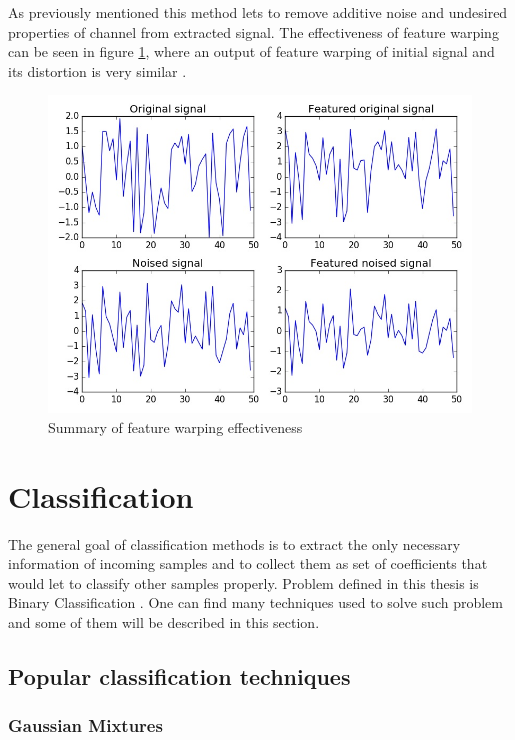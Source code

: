 \documentclass[magister]{dyplom}
\begin{document}
	As previously mentioned this method lets to remove additive noise and undesired properties of channel from extracted signal. The effectiveness of feature warping can be seen in figure \ref{fig:feature_warping_summary}, where an output of feature warping of initial signal and its distortion is very similar .
	
	\begin{figure}[!th]
		\centering
		\includegraphics[width=0.7\linewidth]{images/feature_warping_summary}
		\caption{Summary of feature warping effectiveness}
		\label{fig:feature_warping_summary}
	\end{figure}

	\FloatBarrier
	
	\section{Classification} \label{sec:classification}
	
	The general goal of classification methods is to extract the only necessary information of incoming samples and to collect them as set of coefficients that would let to classify other samples properly. Problem defined in this thesis is Binary Classification \cite{IntroductionToMachineLearning}. One can find many techniques used to solve such problem and some of them will be described in this section.
	
	\subsection{Popular classification techniques}
	
	\subsubsection{Gaussian Mixtures}
	
\end{document}
